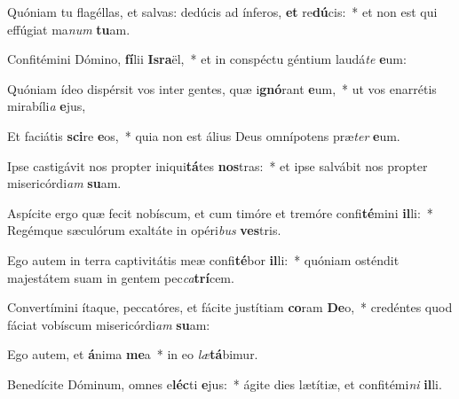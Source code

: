 \item Quóniam tu flagéllas, et salvas: dedúcis ad ínferos, \textbf{et} re\textbf{dú}cis:~* et non est qui effúgiat ma\textit{num} \textbf{tu}am.
\item Confitémini Dómino, \textbf{fí}lii \textbf{Is}\textbf{ra}ël,~* et in conspéctu géntium laudá\textit{te} \textbf{e}um:
\item Quóniam ídeo dispérsit vos inter gentes, quæ i\textbf{gnó}rant \textbf{e}um,~* ut vos enarrétis mirabíli\textit{a} \textbf{e}jus,
\item Et faciátis \textbf{sci}re \textbf{e}os,~* quia non est álius Deus omnípotens præ\textit{ter} \textbf{e}um.
\item Ipse castigávit nos propter iniqui\textbf{tá}tes \textbf{nos}tras:~* et ipse salvábit nos propter misericórdi\textit{am} \textbf{su}am.
\item Aspícite ergo quæ fecit nobíscum, et cum timóre et tremóre confi\textbf{té}mini \textbf{il}li:~* Regémque sæculórum exaltáte in opéri\textit{bus} \textbf{ves}tris.
\item Ego autem in terra captivitátis meæ confi\textbf{té}bor \textbf{il}li:~* quóniam osténdit majestátem suam in gentem pec\textit{ca}\textbf{trí}cem.
\item Convertímini ítaque, peccatóres, et fácite justítiam \textbf{co}ram \textbf{De}o,~* credéntes quod fáciat vobíscum misericórdi\textit{am} \textbf{su}am:
\item Ego autem, et \textbf{á}nima \textbf{me}a~* in eo \textit{læ}\textbf{tá}bimur.
\item Benedícite Dóminum, omnes e\textbf{léc}ti \textbf{e}jus:~* ágite dies lætítiæ, et confitémi\textit{ni} \textbf{il}li.
